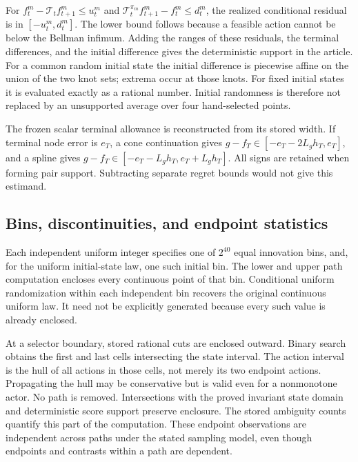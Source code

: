 For $f_t^m-\mathcal T_tf_{t+1}^m\le u_t^m$ and $\mathcal T_t^{\pi_m}f_{t+1}^m-f_t^m\le d_t^m$, the realized conditional residual is in $[-u_t^m,d_t^m]$. The lower bound follows because a feasible action cannot be below the Bellman infimum. Adding the ranges of these residuals, the terminal differences, and the initial difference gives the deterministic support in the article. For a common random initial state the initial difference is piecewise affine on the union of the two knot sets; extrema occur at those knots. For fixed initial states it is evaluated exactly as a rational number. Initial randomness is therefore not replaced by an unsupported average over four hand-selected points.

The frozen scalar terminal allowance is reconstructed from its stored width. If terminal node error is $e_T$, a cone continuation gives $g-f_T\in[-e_T-2L_gh_T,e_T]$, and a spline gives $g-f_T\in[-e_T-L_gh_T,e_T+L_gh_T]$. All signs are retained when forming pair support. Subtracting separate regret bounds would not give this estimand.

\subsection{Bins, discontinuities, and endpoint statistics}
Each independent uniform integer specifies one of $2^{40}$ equal innovation bins, and, for the uniform initial-state law, one such initial bin. The lower and upper path computation encloses every continuous point of that bin. Conditional uniform randomization within each independent bin recovers the original continuous uniform law. It need not be explicitly generated because every such value is already enclosed.

At a selector boundary, stored rational cuts are enclosed outward. Binary search obtains the first and last cells intersecting the state interval. The action interval is the hull of all actions in those cells, not merely its two endpoint actions. Propagating the hull may be conservative but is valid even for a nonmonotone actor. No path is removed. Intersections with the proved invariant state domain and deterministic score support preserve enclosure. The stored ambiguity counts quantify this part of the computation. These endpoint observations are independent across paths under the stated sampling model, even though endpoints and contrasts within a path are dependent.

